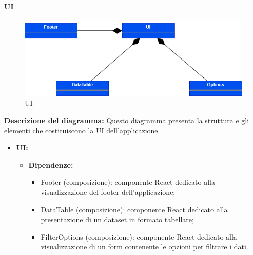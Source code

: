 \paragraph{UI}
\begin{figure}[h!] \centering
    \includegraphics[scale=0.45]{template/images/uml_front/ui/ui.png}
    \caption{UI}
\end{figure}
\textbf{Descrizione del diagramma:}
Questo diagramma presenta la struttura e gli elementi che costituiscono la UI dell'applicazione.
\begin{itemize}
    \item \textbf{UI:}
          \begin{itemize}
              \item \textbf{Dipendenze:}
                    \begin{itemize}
                        \item Footer (composizione): componente React dedicato alla visualizzazione del
                              footer dell'applicazione;
                        \item DataTable (composizione): componente React dedicato alla presentazione di un
                              dataset in formato tabellare;
                        \item FilterOptions (composizione): componente React dedicato alla visualizzazione di
                              un form contenente le opzioni per filtrare i dati.
                    \end{itemize}
          \end{itemize}
\end{itemize}

\pagebreak

